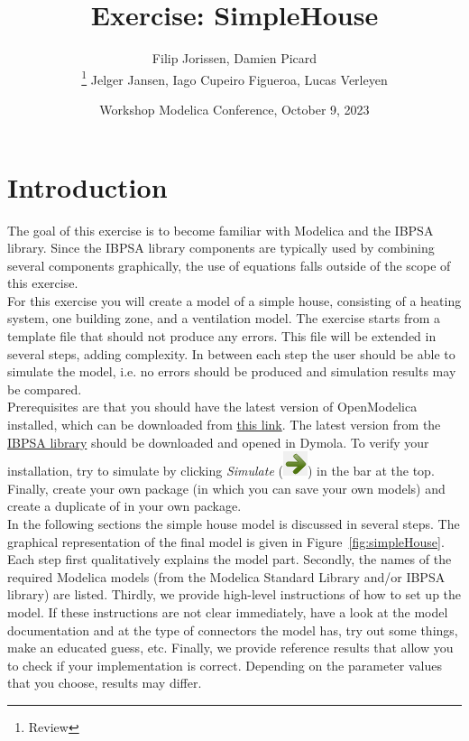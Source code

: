 \documentclass[10pt,a4paper]{article}
\begin{document}
\title{Exercise: SimpleHouse}
\author{Filip Jorissen, Damien Picard\\ \thanks{Review} Jelger Jansen, Iago Cupeiro Figueroa, Lucas Verleyen}
\date{Workshop Modelica Conference, October 9, 2023}
\maketitle


\doclicenseThis


\section*{Introduction}
The goal of this exercise is to become familiar with Modelica and the IBPSA library. Since the IBPSA library components are typically used by combining several components graphically, the use of equations falls outside of the scope of this exercise.\\

For this exercise you will create a model of a simple house, consisting of a heating system, one building zone, and a ventilation model. The exercise starts from a template file that should not produce any errors. This file will be extended in several steps, adding complexity. In between each step the user should be able to simulate the model, i.e. no errors should be produced and simulation results may be compared.\\

Prerequisites are that you should have the latest version of OpenModelica installed, which can be downloaded from \href{https://openmodelica.org/}{this link}. The latest version from the \href{https://github.com/ibpsa/modelica-ibpsa}{IBPSA library} should be downloaded and opened in Dymola. To verify your installation, try to simulate  by clicking \textit{Simulate} (\includegraphics[scale=0.35]{img/simulate.png}) in the bar at the top. Finally, create your own package (in which you can save your own models) and create a duplicate of  in your own package.\\

In the following sections the simple house model is discussed in several steps. The graphical representation of the final model is given in Figure~\ref{fig:simpleHouse}. Each step first qualitatively explains the model part. Secondly, the names of the required Modelica models (from the Modelica Standard Library and/or IBPSA library) are listed. Thirdly, we provide high-level instructions of how to set up the model. If these instructions are not clear immediately, have a look at the model documentation and at the type of connectors the model has, try out some things, make an educated guess, etc. Finally, we provide reference results that allow you to check if your implementation is correct. Depending on the parameter values that you choose, results may differ.\\
\end{document}
